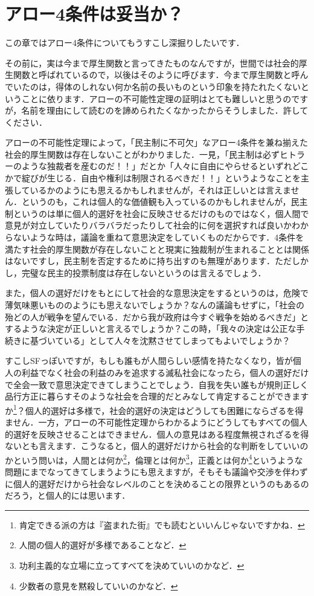 \section{アロー4条件は妥当か？}
この章ではアロー4条件についてもうすこし深掘りしたいです．

その前に，実は今まで厚生関数と言ってきたものなんですが，世間では社会的厚生関数と呼ばれているので，以後はそのように呼びます．今まで厚生関数と呼んでいたのは，得体のしれない何か名前の長いものという印象を持たれたくないということに依ります．アローの不可能性定理の証明はとても難しいと思うのですが，名前を理由にして読むのを諦められたくなかったからそうしました．許してください．

アローの不可能性定理によって，「民主制に不可欠」なアロー4条件を兼ね揃えた社会的厚生関数は存在しないことがわかりました．一見，「民主制は必ずヒトラーのような独裁者を産むのだ！！」だとか「人々に自由にやらせるといずれどこかで綻びが生じる．自由や権利は制限されるべきだ！！」というようなことを主張しているかのようにも思えるかもしれませんが，それは正しいとは言えません．というのも，これは個人的な価値観も入っているのかもしれませんが，民主制というのは単に個人的選好を社会に反映させるだけのものではなく，個人間で意見が対立していたりバラバラだったりして社会的に何を選択すれば良いかわからないような時は，議論を重ねて意思決定をしていくものだからです．4条件を満たす社会的厚生関数が存在しないことと現実に独裁制が生まれることとは関係はないですし，民主制を否定するために持ち出すのも無理があります．ただしかし，完璧な民主的投票制度は存在しないというのは言えるでしょう．

また，個人の選好だけをもとにして社会的な意思決定をするというのは，危険で薄気味悪いもののようにも思えないでしょうか？なんの議論もせずに，「社会の殆どの人が戦争を望んでいる．だから我が政府は今すぐ戦争を始めるべきだ」とするような決定が正しいと言えるでしょうか？この時，「我々の決定は公正な手続きに基づいている」として人々を沈黙させてしまってもよいでしょうか？

すこしSFっぽいですが，もしも誰もが人間らしい感情を持たなくなり，皆が個人の利益でなく社会の利益のみを追求する滅私社会になったら，個人の選好だけで全会一致で意思決定できてしまうことでしょう．自我を失い誰もが規則正しく品行方正に暮らすそのような社会を合理的だとみなして肯定することができますか\footnote{肯定できる派の方は『盗まれた街』でも読むといいんじゃないですかね．}？個人的選好は多様で，社会的選好の決定はどうしても困難にならざるを得ません．一方，アローの不可能性定理からわかるようにどうしてもすべての個人的選好を反映させることはできません．個人の意見はある程度無視されざるを得ないとも言えます．こうなると，個人的選好だけから社会的な判断をしていいのかという問いは，人間とは何か\footnote{人間の個人的選好が多様であることなど．}，倫理とは何か\footnote{功利主義的な立場に立ってすべてを決めていいのかなど．}，正義とは何か\footnote{少数者の意見を黙殺していいのかなど．}というような問題にまでなってきてしまうようにも思えますが，そもそも議論や交渉を伴わずに個人的選好だけから社会なレベルのことを決めることの限界というのもあるのだろう，と個人的には思います．

